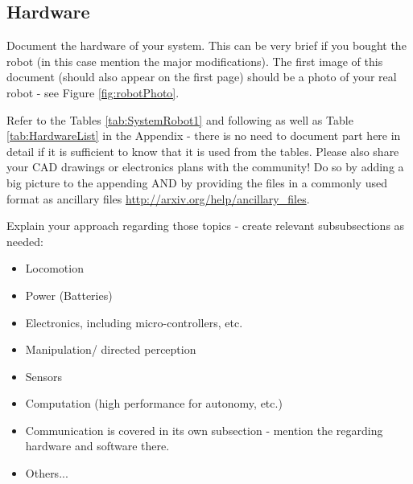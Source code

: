 \subsection{Hardware}
Document the hardware of your system. This can be very brief if you bought the robot (in this case mention the major modifications). The first image of this document (should also appear on the first page) should be a photo of your real robot - see Figure \ref{fig:robotPhoto}.

Refer to the Tables \ref{tab:SystemRobot1} and following as well as Table \ref{tab:HardwareList} in the Appendix - there is no need to document part here in detail if it is sufficient to know that it is used from the tables. Please also share your CAD drawings or electronics plans with the community! Do so by adding a big picture to the appending AND by providing the files in a commonly used format as ancillary files \url{http://arxiv.org/help/ancillary_files}.

Explain your approach regarding those topics - create relevant subsubsections as needed:
\begin{itemize}
  \item Locomotion
  \item Power (Batteries)
  \item Electronics, including micro-controllers, etc.
  \item Manipulation/ directed perception
  \item Sensors
  \item Computation (high performance for autonomy, etc.)
  \item Communication is covered in its own subsection - mention the regarding hardware and software there.
  \item Others...
\end{itemize}